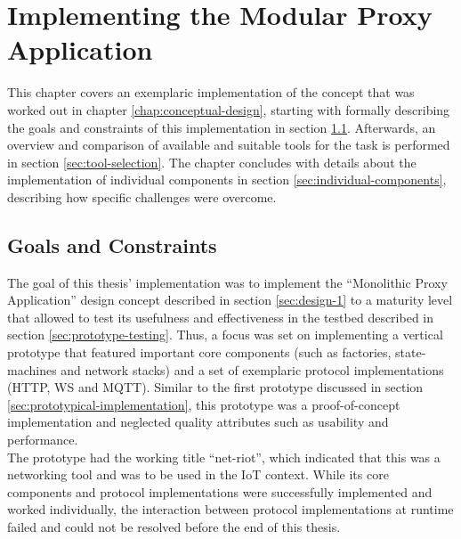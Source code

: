 \chapter{Implementing the Modular Proxy Application}
\label{chap:implementation}
This chapter covers an exemplaric implementation of the concept that was worked out in chapter \ref{chap:conceptual-design}, starting with formally describing the goals and constraints of this implementation in section \ref{sec:goals-constraints}. Afterwards, an overview and comparison of available and suitable tools for the task is performed in section \ref{sec:tool-selection}. The chapter concludes with details about the implementation of individual components in section \ref{sec:individual-components}, describing how specific challenges were overcome.%

\section{Goals and Constraints}
\label{sec:goals-constraints}
The goal of this thesis' implementation was to implement the \enquote{Monolithic Proxy Application} design concept described in section \ref{sec:design-1} to a maturity level that allowed to test its usefulness and effectiveness in the testbed described in section \ref{sec:prototype-testing}. Thus, a focus was set on implementing a vertical prototype that featured important core components (such as factories, state-machines and network stacks) and a set of exemplaric protocol implementations (\ac{HTTP}, \ac{WS} and \ac{MQTT}). Similar to the first prototype discussed in section \ref{sec:prototypical-implementation}, this prototype was a proof-of-concept implementation and neglected quality attributes such as usability and performance.\\
The prototype had the working title \enquote{net-riot}, which indicated that this was a networking tool and was to be used in the \ac{IoT} context. While its core components and protocol implementations were successfully implemented and worked individually, the interaction between protocol implementations at runtime failed and could not be resolved before the end of this thesis.

